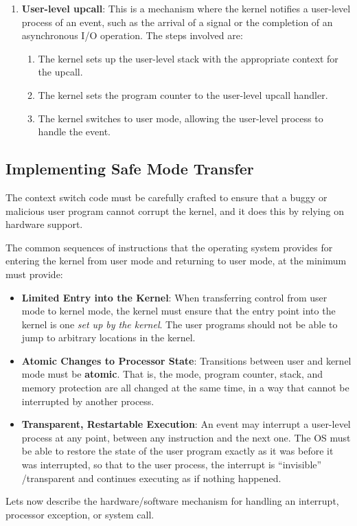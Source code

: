 \documentclass{article}
\begin{document}
\begin{enumerate}
    \item \textbf{User-level upcall}: This is a mechanism where the kernel notifies a user-level process of an event, such as the arrival of a signal or the completion of an asynchronous I/O operation. The steps involved are:
          \begin{enumerate}
              \item The kernel sets up the user-level stack with the appropriate context for the upcall.
              \item The kernel sets the program counter to the user-level upcall handler.
              \item The kernel switches to user mode, allowing the user-level process to handle the event.
          \end{enumerate}
\end{enumerate}

\subsection{Implementing Safe Mode Transfer}
The context switch code must be carefully crafted to ensure that a buggy or malicious user program cannot corrupt the kernel, and it does this by relying on hardware support.

The common sequences of instructions that the operating system provides for entering the kernel from user mode and returning to user mode, at the minimum must provide:
\begin{itemize}
    \item \textbf{Limited Entry into the Kernel}: When transferring control from user mode to kernel mode, the kernel must ensure that the entry point into the kernel is one \textit{set up by the kernel}. The user programs should not be able to jump to arbitrary locations in the kernel.
    \item \textbf{Atomic Changes to Processor State}: Transitions between user and kernel mode must be \textbf{atomic}. That is, the mode, program counter, stack, and memory protection are all changed at the same time, in a way that cannot be interrupted by another process.
    \item \textbf{Transparent, Restartable Execution}: An event may interrupt a user-level process at any point, between any instruction and the next one. The OS must be able to restore the state of the user program exactly as it was before it was interrupted, so that to the user process, the interrupt is ``invisible'' /transparent and continues executing as if nothing happened.
\end{itemize}
Lets now describe the hardware/software mechanism for handling an interrupt, processor exception, or system call.
\end{document}
